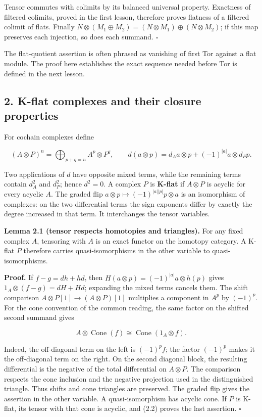 \documentclass[
  english,
  11pt,
  a4paper,
]{article}
\begin{document}
Tensor commutes with colimits by its balanced universal property.
Exactness of filtered colimits, proved in the first lesson, therefore
proves flatness of a filtered colimit of flats. Finally
\(N\otimes(M_1\oplus M_2)=(N\otimes M_1)\oplus(N\otimes M_2)\); if this
map preserves each injection, so does each summand. \(\square\)

The flat-quotient assertion is often phrased as vanishing of first Tor
against a flat module. The proof here establishes the exact sequence
needed before Tor is defined in the next lesson.

\subsection{2. K-flat complexes and their closure
properties}\label{flat-modules-and-k-flat-resolutions--2-k-flat-complexes-and-their-closure-properties}

For cochain complexes define

\[(A\otimes P)^n=\bigoplus_{p+q=n}A^p\otimes P^q,
\qquad d(a\otimes p)=d_Aa\otimes p+(-1)^{|a|}a\otimes d_Pp.
\tag{2.1}\]

Two applications of \(d\) have opposite mixed terms, while the remaining
terms contain \(d_A^2\) and \(d_P^2\); hence \(d^2=0\). A complex \(P\)
is \textbf{K-flat} if \(A\otimes P\) is acyclic for every acyclic \(A\).
The graded flip \(a\otimes p\mapsto(-1)^{|a||p|}p\otimes a\) is an
isomorphism of complexes: on the two differential terms the sign
exponents differ by exactly the degree increased in that term. It
interchanges the tensor variables.

\textbf{Lemma 2.1 (tensor respects homotopies and triangles).} For any
fixed complex \(A\), tensoring with \(A\) is an exact functor on the
homotopy category. A K-flat \(P\) therefore carries quasi-isomorphisms
in the other variable to quasi-isomorphisms.

\textbf{Proof.} If \(f-g=dh+hd\), then
\(H(a\otimes p)=(-1)^{|a|}a\otimes h(p)\) gives
\(1_A\otimes(f-g)=dH+Hd\); expanding the mixed terms cancels them. The
shift comparison \(A\otimes P[1]\to(A\otimes P)[1]\) multiplies a
component in \(A^p\) by \((-1)^p\). For the cone convention of the
common reading, the same factor on the shifted second summand gives

\[A\otimes\operatorname{Cone}(f)
\cong\operatorname{Cone}(1_A\otimes f).
\tag{2.2}\]

Indeed, the off-diagonal term on the left is \((-1)^pf\); the factor
\((-1)^p\) makes it the off-diagonal term on the right. On the second
diagonal block, the resulting differential is the negative of the total
differential on \(A\otimes P\). The comparison respects the cone
inclusion and the negative projection used in the distinguished
triangle. Thus shifts and cone triangles are preserved. The graded flip
gives the assertion in the other variable. A quasi-isomorphism has
acyclic cone. If \(P\) is K-flat, its tensor with that cone is acyclic,
and (2.2) proves the last assertion. \(\square\)
\end{document}
